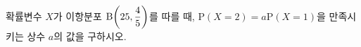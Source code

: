 확률변수 $X$가 이항분포 $\mathrm{B}\!\left(25{,}\mkern3mu\mathopen{}\dfrac{4}{5}\right)$를 따를 때, $\mathrm{P}(X=2)=a\mathrm{P}(X=1)$을 만족시키는 상수 $a$의 값을 구하시오.
